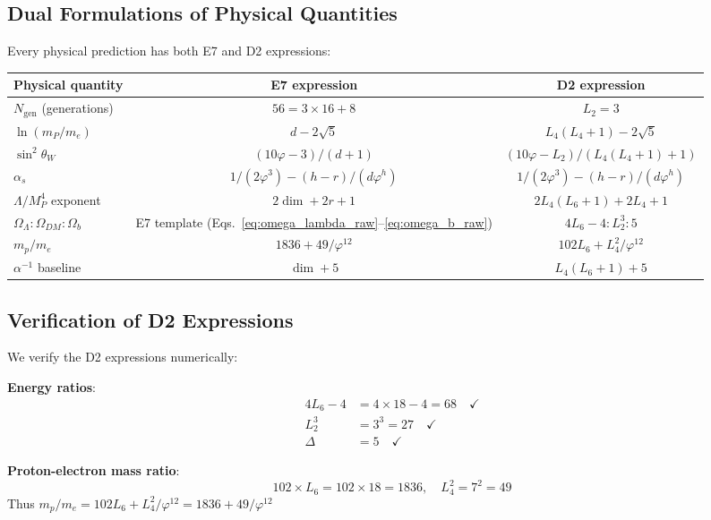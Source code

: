 \documentclass[11pt,a4paper]{article}
\begin{document}
\subsection{Dual Formulations of Physical Quantities}

Every physical prediction has both E7 and D2 expressions:

\begin{center}
\begin{tabular}{|l|c|c|}
\hline
\textbf{Physical quantity} & \textbf{E7 expression} & \textbf{D2 expression} \\
\hline
$N_{\text{gen}}$ (generations) & $56 = 3 \times 16 + 8$ & $L_2 = 3$ \\
$\ln(m_P/m_e)$ & $d - 2\sqrt{5}$ & $L_4(L_4+1) - 2\sqrt{5}$ \\
$\sin^2\theta_W$ & $(10\varphi - 3)/(d+1)$ & $(10\varphi - L_2)/(L_4(L_4+1)+1)$ \\
$\alpha_s$ & $1/(2\varphi^3) - (h{-}r)/(d\varphi^h)$ & $1/(2\varphi^3) - (h{-}r)/(d\varphi^h)$ \\
$\Lambda/M_P^4$ exponent & $2\dim + 2r + 1$ & $2L_4(L_6+1) + 2L_4 + 1$ \\
$\Omega_\Lambda : \Omega_{DM} : \Omega_b$ & E7 template (Eqs.~\ref{eq:omega_lambda_raw}--\ref{eq:omega_b_raw}) & $4L_6 - 4 : L_2^3 : 5$ \\
$m_p/m_e$ & $1836 + 49/\varphi^{12}$ & $102 L_6 + L_4^2/\varphi^{12}$ \\
$\alpha^{-1}$ baseline & $\dim + 5$ & $L_4(L_6+1) + 5$ \\
\hline
\end{tabular}
\end{center}

\subsection{Verification of D2 Expressions}

We verify the D2 expressions numerically:

\textbf{Energy ratios}:
\begin{align}
4L_6 - 4 &= 4 \times 18 - 4 = 68 \quad \checkmark \\
L_2^3 &= 3^3 = 27 \quad \checkmark \\
\Delta &= 5 \quad \checkmark
\end{align}

\textbf{Proton-electron mass ratio}:
\begin{equation}
102 \times L_6 = 102 \times 18 = 1836, \quad L_4^2 = 7^2 = 49
\end{equation}
Thus $m_p/m_e = 102 L_6 + L_4^2/\varphi^{12} = 1836 + 49/\varphi^{12}$ \checkmark
\end{document}
